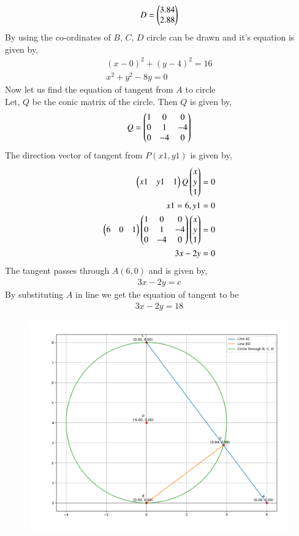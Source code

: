 \documentclass[journal]{IEEEtran}
\begin{document}
\begin{align}
    D=\begin{pmatrix}3.84\\2.88\end{pmatrix}
\end{align}
By using the co-ordinates of $B$, $C$, $D$ circle can be drawn and it's equation is given by,
\begin{align}
    (x-0)^{2}+(y-4)^{2}=16 \\
    x^2+y^2-8y=0
\end{align}
Now let us find the equation of tangent from $A$ to circle \\
Let, $Q$ be the conic matrix of the circle. Then $Q$ is given by,
\begin{align}
    Q=\begin{pmatrix}1&0&0\\0&1&-4\\0&-4&0\end{pmatrix}
\end{align}
The direction vector of tangent from $P(x1,y1)$ is given by,
\begin{align}
    \begin{pmatrix}x1&y1&1\end{pmatrix}Q\begin{pmatrix}x\\y\\1\end{pmatrix} =0\\
    x1=6,y1=0\\
    \begin{pmatrix}6&0&1\end{pmatrix}\begin{pmatrix}1&0&0\\0&1&-4\\0&-4&0\end{pmatrix}\begin{pmatrix}x\\y\\1\end{pmatrix} =0\\
    3x-2y=0
\end{align}
The tangent passes through $A(6,0)$ and is given by,
\begin{align}
    3x-2y=c
\end{align}
By substituting $A$ in line we get the equation of tangent to be 
\begin{align}
    3x-2y=18
\end{align}
\begin{figure}[h!]
   \centering
   \includegraphics[width=\linewidth]{figs/figure_1.png}
   \label{stemplot}
   \caption{}
\end{figure}
\end{document}

